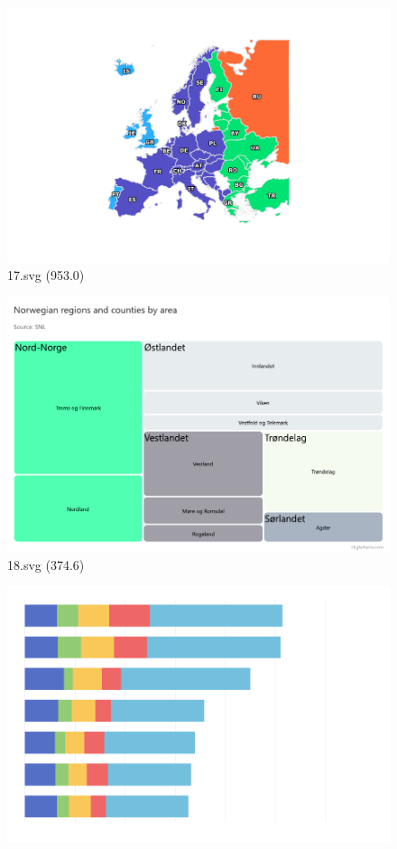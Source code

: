 \documentclass[journal]{IEEEtran}
\begin{document}
\begin{figure}[!htbp]
\centering
\begin{minipage}{0.233\columnwidth}
\centering
\includegraphics[width=\textwidth]{Test_set/17.pdf}
{17.svg (953.0)}
\end{minipage}
\hfill
\begin{minipage}{0.233\columnwidth}
\centering
\includegraphics[width=\textwidth]{Test_set/18.pdf}
{18.svg (374.6)}
\end{minipage}
\hfill
\begin{minipage}{0.233\columnwidth}
\centering
\includegraphics[width=\textwidth]{Test_set/19.pdf}

\end{minipage}
\end{figure}
\end{document}
